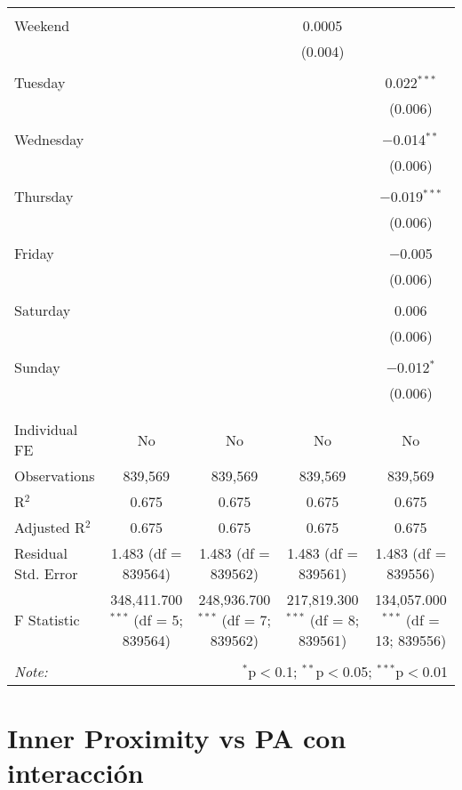 \documentclass[
]{article}
\begin{document}
\begin{table}[!htbp]
{\begin{tabular}{@{\extracolsep{5pt}}lcccc}
  & & & & \\ 
 Weekend &  &  & 0.0005 &  \\ 
  &  &  & (0.004) &  \\ 
  & & & & \\ 
 Tuesday &  &  &  & 0.022$^{***}$ \\ 
  &  &  &  & (0.006) \\ 
  & & & & \\ 
 Wednesday &  &  &  & $-$0.014$^{**}$ \\ 
  &  &  &  & (0.006) \\ 
  & & & & \\ 
 Thursday &  &  &  & $-$0.019$^{***}$ \\ 
  &  &  &  & (0.006) \\ 
  & & & & \\ 
 Friday &  &  &  & $-$0.005 \\ 
  &  &  &  & (0.006) \\ 
  & & & & \\ 
 Saturday &  &  &  & 0.006 \\ 
  &  &  &  & (0.006) \\ 
  & & & & \\ 
 Sunday &  &  &  & $-$0.012$^{*}$ \\ 
  &  &  &  & (0.006) \\ 
  & & & & \\ 
\hline \\[-1.8ex] 
Individual FE & No & No & No & No \\ 
Observations & 839,569 & 839,569 & 839,569 & 839,569 \\ 
R$^{2}$ & 0.675 & 0.675 & 0.675 & 0.675 \\ 
Adjusted R$^{2}$ & 0.675 & 0.675 & 0.675 & 0.675 \\ 
Residual Std. Error & 1.483 (df = 839564) & 1.483 (df = 839562) & 1.483 (df = 839561) & 1.483 (df = 839556) \\ 
F Statistic & 348,411.700$^{***}$ (df = 5; 839564) & 248,936.700$^{***}$ (df = 7; 839562) & 217,819.300$^{***}$ (df = 8; 839561) & 134,057.000$^{***}$ (df = 13; 839556) \\ 
\hline 
\hline \\[-1.8ex] 
\textit{Note:}  & \multicolumn{4}{r}{$^{*}$p$<$0.1; $^{**}$p$<$0.05; $^{***}$p$<$0.01} \\ 
\end{tabular}
} 
\end{table} 
\newpage
\section{Inner Proximity vs PA con interacción}
\end{document}

